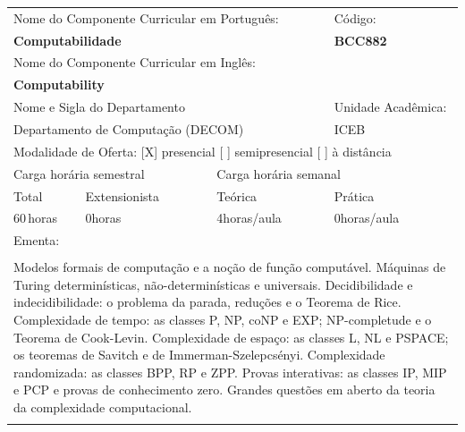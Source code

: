 \documentclass[11pt]{article}
\begin{document}
\begin{center}
\begin{longtable}{|p{4cm}|p{4cm}|p{4cm}|p{4cm}|}
\hline
\multicolumn{3}{|p{12cm}|}{Nome do Componente Curricular em Português:} &
\multicolumn{1}{p{4cm}|}{Código:} \\ 
\multicolumn{3}{|p{12cm}|}{\textbf{Computabilidade}} &
\textbf{BCC882}\\ 
\multicolumn{3}{|p{12cm}|}{Nome do Componente Curricular em Inglês:} & \\ 
\multicolumn{3}{|p{12cm}|}{\textbf{Computability}} & \\ 
\hline
\multicolumn{3}{|p{12cm}|}{Nome e Sigla do Departamento} & Unidade Acadêmica: \\ 
\multicolumn{3}{|p{12cm}|}{Departamento de Computação (DECOM)} & {ICEB} \\ 
\hline
\multicolumn{4}{|p{16cm}|}{Modalidade de Oferta:
[X] presencial \hspace{0.6cm}
[ ] semipresencial \hspace{0.6cm}
[ ] à distância}\\
\hline
\multicolumn{2}{|p{8cm}|}{Carga horária semestral} &
\multicolumn{2}{p{8cm}|}{Carga horária semanal}\\
\hline
\multicolumn{1}{|p{4cm}|}{Total} &
\multicolumn{1}{p{4cm}|}{Extensionista} &
\multicolumn{1}{p{4cm}|}{Teórica} &
\multicolumn{1}{p{4cm}|}{Prática} \\ 
\multicolumn{1}{|p{4cm}|}{60\,horas} &
\multicolumn{1}{p{4cm}|}{0\;horas} &
\multicolumn{1}{p{4cm}|}{4\;horas/aula} &
\multicolumn{1}{p{4cm}|}{0\;horas/aula} \\ 
\hline
\multicolumn{4}{|p{16cm}|}{Ementa:}\\
\multicolumn{4}{|p{16cm}|}{}\\
\multicolumn{4}{|p{\dimexpr 16cm + 6\tabcolsep\relax}|}{Modelos formais de computação e a noção de função computável. Máquinas de Turing determinísticas, não-determinísticas e universais. Decidibilidade e indecidibilidade: o problema da parada, reduções e o Teorema de Rice. Complexidade de tempo: as classes P, NP, coNP e EXP; NP-completude e o Teorema de Cook-Levin. Complexidade de espaço: as classes L, NL e PSPACE; os teoremas de Savitch e de Immerman-Szelepcsényi. Complexidade randomizada: as classes BPP, RP e ZPP. Provas interativas: as classes IP, MIP e PCP e provas de conhecimento zero. Grandes questões em aberto da teoria da complexidade computacional.}\\
\multicolumn{4}{|p{16cm}|}{}\\

\end{longtable}
\end{center}
\end{document}
